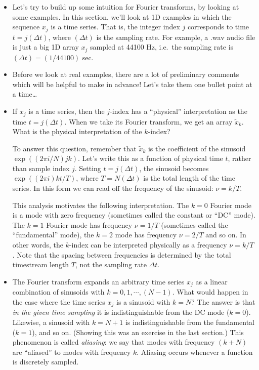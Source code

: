 \documentclass[aps,prd,superscriptaddress,groupedaddress,nofootinbib,nobibnotes]{revtex4}
\def\tx{{\tilde x}}
\begin{document}
\begin{itemize}

\item Let's try to build up some intuition for Fourier transforms, by looking at some examples.
 In this section, we'll look at 1D examples in which the sequence $x_j$ is a time series.
 That is, the integer index $j$ corresponds to time $t = j (\Delta t)$, where $(\Delta t)$
 is the sampling rate.
 For example, a .wav audio file is just a big 1D array $x_j$ sampled at 44100 Hz, i.e.~the
 sampling rate is $(\Delta t) = (1/44100)$ sec.

\item Before we look at real examples, there are a lot of preliminary comments which
 will be helpful to make in advance!  Let's take them one bullet point at a time\ldots

\item If $x_j$ is a time series, then the $j$-index has a ``physical'' interpretation as
 the time $t = j (\Delta t)$.
 When we take its Fourier transform, we get an array $\tx_k$.  What is the physical
 interpretation of the $k$-index?

 To answer this question, remember that $\tx_k$ is the coefficient of the sinusoid $\exp((2\pi i/N) jk)$.
 Let's write this as a function of physical time $t$, rather than sample index $j$.  Setting $t = j (\Delta t)$,
 the sinusoid becomes $\exp((2\pi i) k t / T)$, where $T = N (\Delta t)$ is the total length of the time series.
 In this form we can read off the frequency of the sinusoid: $\nu = k/T$.

 This analysis motivates the following interpretation.  The $k=0$ Fourier mode is a mode with zero frequency
 (sometimes called the constant or ``DC'' mode).  The $k=1$ Fourier mode has frequency $\nu = 1/T$ (sometimes
 called the ``fundamental'' mode), the $k=2$ mode has frequency $\nu=2/T$ and so on.  In other words, the $k$-index
 can be interpreted physically as a frequency $\nu = k/T$.  Note that the spacing
 between frequencies is determined by the total timestream length $T$, not the sampling rate $\Delta t$.

\item The Fourier transform expands an arbitrary time series $x_j$ as a linear combination of 
  sinusoids with $k = 0, 1, \cdots, (N-1)$.  
  What would happen in the case where the time series $x_j$ is a sinusoid with $k=N$?
  The answer is that {\em in the given time sampling} it is indistinguishable from the DC mode ($k=0$).
  Likewise, a sinusoid with $k=N+1$ is indistinguishable from the fundamental ($k=1$), and so on.
  (Showing this was an exercise in the last section.)
  This phenomenon is called {\em aliasing}: we say that modes with frequency $(k+N)$ are ``aliased''
  to modes with frequency $k$.  Aliasing occurs whenever a function is discretely sampled.


\end{itemize}
\end{document}
